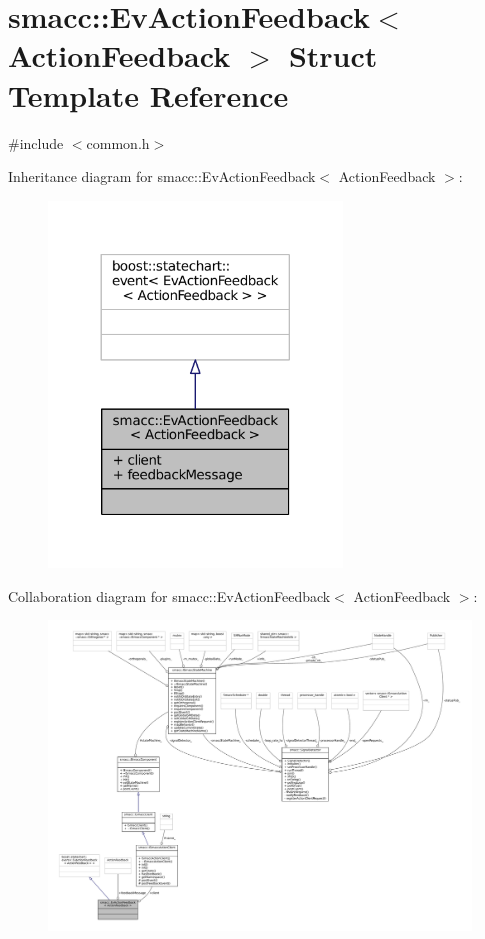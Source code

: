 \hypertarget{structsmacc_1_1EvActionFeedback}{}\section{smacc\+:\+:Ev\+Action\+Feedback$<$ Action\+Feedback $>$ Struct Template Reference}
\label{structsmacc_1_1EvActionFeedback}


{\ttfamily \#include $<$common.\+h$>$}



Inheritance diagram for smacc\+:\+:Ev\+Action\+Feedback$<$ Action\+Feedback $>$\+:
\nopagebreak
\begin{figure}[H]
\begin{center}
\leavevmode
\includegraphics[width=221pt]{structsmacc_1_1EvActionFeedback__inherit__graph}
\end{center}
\end{figure}


Collaboration diagram for smacc\+:\+:Ev\+Action\+Feedback$<$ Action\+Feedback $>$\+:
\nopagebreak
\begin{figure}[H]
\begin{center}
\leavevmode
\includegraphics[width=350pt]{structsmacc_1_1EvActionFeedback__coll__graph}
\end{center}
\end{figure}
